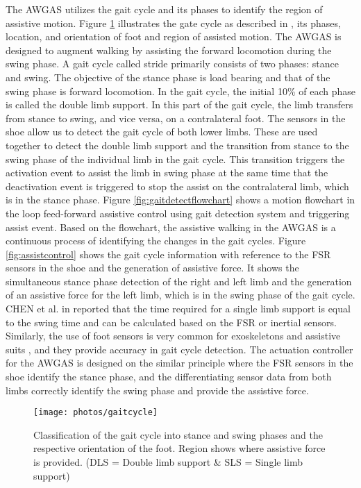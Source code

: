 \documentclass[paper,JRM,paper]{jaciiiarticle}
\begin{document}
The AWGAS utilizes the gait cycle and its phases to identify the region of assistive motion. Figure \ref{fig:gaitcycle} illustrates the gate cycle as described in \cite{12}, its phases, location, and orientation of foot and region of assisted motion. The AWGAS is designed to augment walking by assisting the forward locomotion during the swing phase. A gait cycle called stride primarily consists of two phases: stance and swing. The objective of the stance phase is load bearing and that of the swing phase is forward locomotion. In the gait cycle, the initial 10\% of each phase is called the double limb support. In this part of the gait cycle, the limb transfers from stance to swing, and vice versa, on a contralateral foot. The sensors in the shoe allow us to detect the gait cycle of both lower limbs. These are used together to detect the double limb support and the transition from stance to the swing phase of the individual limb in the gait cycle. This transition triggers the activation event to assist the limb in swing phase at the same time that the deactivation event is triggered to stop the assist on the contralateral limb, which is in the stance phase. Figure \ref{fig:gaitdetectflowchart} shows a motion flowchart in the loop feed-forward assistive control using gait detection system and triggering assist event. Based on the flowchart, the assistive walking in the AWGAS is a continuous process of identifying the changes in the gait cycles. Figure \ref{fig:assistcontrol} shows the gait cycle information with reference to the FSR sensors in the shoe and the generation of assistive force. It shows the simultaneous stance phase detection of the right and left limb and the generation of an assistive force for the left limb, which is in the swing phase of the gait cycle. CHEN  et al. in \cite{13} reported that the time required for a single limb support is equal to the swing time and can be calculated based on the FSR or inertial sensors. Similarly, the use of foot sensors is very common for exoskeletons and assistive suits \cite{14,15,16,17,18,19,20,21}, and they provide accuracy in gait cycle detection. The actuation controller for the AWGAS is designed on the similar principle where the FSR sensors in the shoe identify the stance phase, and the differentiating sensor data from both limbs correctly identify the swing phase and provide the assistive force.

\begin{figure}[h]
	\centering
	\texttt{[image: photos/gaitcycle]}
	\caption{Classification of the gait cycle into stance and swing phases and the respective orientation of the foot. Region shows where assistive force is provided. (DLS = Double limb support \& SLS = Single limb support) }
	\label{fig:gaitcycle}
\end{figure}
\end{document}
